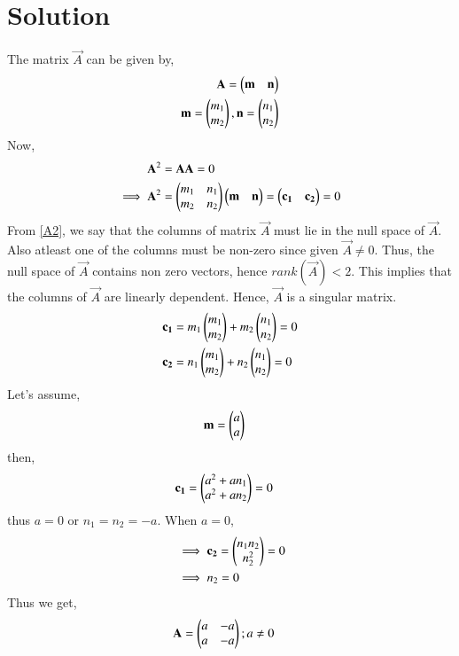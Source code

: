 \documentclass[journal,12pt,twocolumn]{IEEEtran}
\begin{document}
\section{Solution}
The matrix $\vec{A}$ can be given by, 
\begin{align}
    \mathbf{A} = \begin{pmatrix}\mathbf{m}&\mathbf{n}\end{pmatrix} \\
    \mathbf{m} = \begin{pmatrix}m_1\\m_2\end{pmatrix}, \mathbf{n} = \begin{pmatrix}n_1\\n_2\end{pmatrix}
\end{align}
Now, 
\begin{align}
    \mathbf{A}^{2} &= \mathbf{A}\mathbf{A} = 0 \\
    \implies\mathbf{A}^{2} &= \begin{pmatrix}m_1&n_1\\m_2&n_2\end{pmatrix}\begin{pmatrix}\mathbf{m}&\mathbf{n}\end{pmatrix} = \begin{pmatrix}\mathbf{c_1}&\mathbf{c_2}\end{pmatrix} = 0 \label{A2}
\end{align}
From \eqref{A2}, we say that the columns of matrix $\vec{A}$ must lie in the null space of $\vec{A}$. Also atleast one of the columns must be non-zero since given $\vec{A}\ne0$. 
Thus, the null space of $\vec{A}$ contains non zero vectors, hence $rank(\vec{A})<2$. 
This implies that the columns of $\vec{A}$ are linearly dependent.
Hence, $\vec{A}$ is a singular matrix. 
\begin{align}
    \mathbf{c_1} &= m_1\begin{pmatrix}m_1\\m_2\end{pmatrix} + m_2\begin{pmatrix}n_1\\n_2\end{pmatrix} = 0 \\
    \mathbf{c_2} &= n_1\begin{pmatrix}m_1\\m_2\end{pmatrix} + n_2\begin{pmatrix}n_1\\n_2\end{pmatrix} = 0
\end{align}
Let's assume, 
\begin{align}
    \mathbf{m} &= \begin{pmatrix}a\\a\end{pmatrix}
\end{align}
then, 
\begin{align}
    &\mathbf{c_1} = \begin{pmatrix}a^2+an_1\\a^2+an_2\end{pmatrix}=0
\end{align}
thus $a=0$ or $n_1=n_2=-a$. When $a=0$, 
\begin{align}
    &\implies\mathbf{c_2} = \begin{pmatrix}n_1n_2\\n_2^2\end{pmatrix}=0\\
    &\implies n_2 = 0
\end{align}
Thus we get, 
\begin{align}
    \mathbf{A} &= \begin{pmatrix}a&-a\\a&-a\end{pmatrix} ; a\ne0
\end{align}
\end{document}
